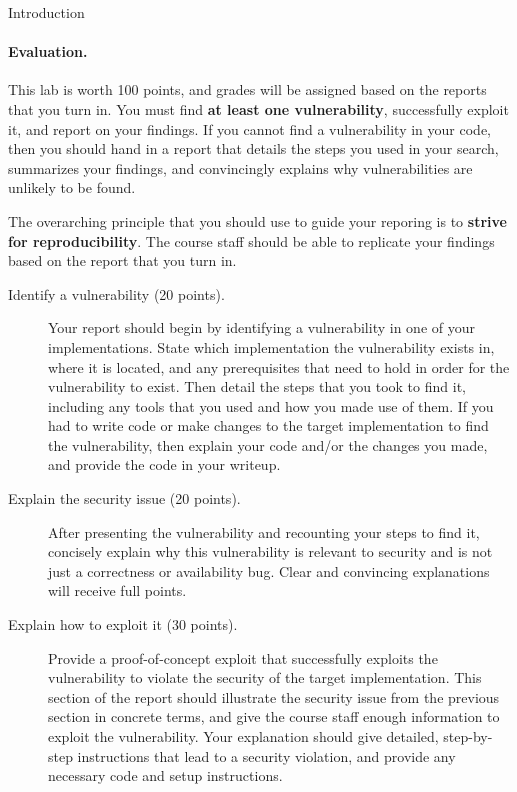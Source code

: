 \documentclass[11pt]{article}
\begin{document}
\begin{problem}{Introduction}
  \paragraph{Evaluation.}
    This lab is worth 100 points, and grades will be assigned based on the reports that you turn in. You must find \textbf{at least one vulnerability}, successfully exploit it, and report on your findings. If you cannot find a vulnerability in your code, then you should hand in a report that details the steps you used in your search, summarizes your findings, and convincingly explains why vulnerabilities are unlikely to be found.

    The overarching principle that you should use to guide your reporing is to \textbf{strive for reproducibility}. The course staff should be able to replicate your findings based on the report that you turn in.
    \begin{description}
      \item[Identify a vulnerability (20 points).] Your report should begin by identifying a vulnerability in one of your implementations. State which implementation the vulnerability exists in, where it is located, and any prerequisites that need to hold in order for the vulnerability to exist. 
      Then detail the steps that you took to find it, including any tools that you used and how you made use of them. If you had to write code or make changes to the target implementation to find the vulnerability, then explain your code and/or the changes you made, and provide the code in your writeup.
      \item[Explain the security issue (20 points).] After presenting the vulnerability and recounting your steps to find it, concisely explain why this vulnerability is relevant to security and is not just a correctness or availability bug. Clear and convincing explanations will receive full points.
      \item[Explain how to exploit it (30 points).] Provide a proof-of-concept exploit that successfully exploits the vulnerability to violate the security of the target implementation. This section of the report should illustrate the security issue from the previous section in concrete terms, and give the course staff enough information to exploit the vulnerability. Your explanation should give detailed, step-by-step instructions that lead to a security violation, and provide any necessary code and setup instructions.

\end{description}
\end{problem}
\end{document}
